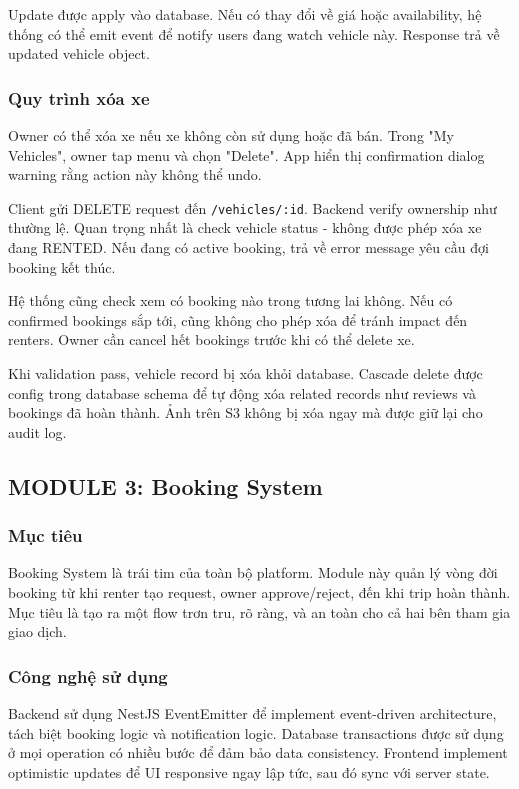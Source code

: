 Update được apply vào database. Nếu có thay đổi về giá hoặc availability, hệ thống có thể emit event để notify users đang watch vehicle này. Response trả về updated vehicle object.

\subsubsection{Quy trình xóa xe}
Owner có thể xóa xe nếu xe không còn sử dụng hoặc đã bán. Trong "My Vehicles", owner tap menu và chọn "Delete". App hiển thị confirmation dialog warning rằng action này không thể undo.

Client gửi DELETE request đến \texttt{/vehicles/:id}. Backend verify ownership như thường lệ. Quan trọng nhất là check vehicle status - không được phép xóa xe đang RENTED. Nếu đang có active booking, trả về error message yêu cầu đợi booking kết thúc.

Hệ thống cũng check xem có booking nào trong tương lai không. Nếu có confirmed bookings sắp tới, cũng không cho phép xóa để tránh impact đến renters. Owner cần cancel hết bookings trước khi có thể delete xe.

Khi validation pass, vehicle record bị xóa khỏi database. Cascade delete được config trong database schema để tự động xóa related records như reviews và bookings đã hoàn thành. Ảnh trên S3 không bị xóa ngay mà được giữ lại cho audit log.

\subsection{MODULE 3: Booking System}

\subsubsection{Mục tiêu}
Booking System là trái tim của toàn bộ platform. Module này quản lý vòng đời booking từ khi renter tạo request, owner approve/reject, đến khi trip hoàn thành. Mục tiêu là tạo ra một flow trơn tru, rõ ràng, và an toàn cho cả hai bên tham gia giao dịch.

\subsubsection{Công nghệ sử dụng}
Backend sử dụng NestJS EventEmitter để implement event-driven architecture, tách biệt booking logic và notification logic. Database transactions được sử dụng ở mọi operation có nhiều bước để đảm bảo data consistency. Frontend implement optimistic updates để UI responsive ngay lập tức, sau đó sync với server state.

